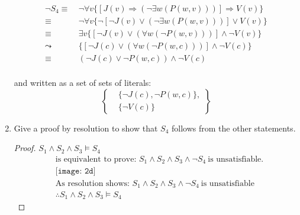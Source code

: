 \documentclass[11pt]{article}
\newcommand{\impl}{\mathbin{\Rightarrow}}
\begin{document}
\begin{enumerate}[label=\alph*.]
    \begin{align*}
        \neg S_4 \equiv\  & \neg \forall v \{ [J(v) \impl (\neg \exists w (P(w, v)))] \impl V(v) \} \\
        \equiv\  & \neg \forall v \{ \neg [\neg J(v) \lor (\neg \exists w (P(w, v)))] \lor V(v) \} \tag{by replacing occurrence of $\Rightarrow$} \\
        \equiv\  & \exists v \{ [\neg J(v) \lor ( \forall w (\neg P(w, v)))] \land \neg V(v) \} \tag{by deriving negation in} \\
        \leadsto\  & \{ [\neg J(c) \lor (\forall w (\neg P(w, c)))] \land \neg V(c) \} \tag{by skolemization} \\
        \equiv\  & (\neg J(c) \lor \neg P(w, c)) \land \neg V(c) \tag{by dropping universal quantifiers} \\
    \end{align*}
    
    and written as a set of sets of literals: 
    $$\left\{
        \begin{aligned}  
            &\{\neg J(c), \neg P(w, c) \}, \\
            &\{\neg V(c) \}
        \end{aligned}
    \right\} $$
    
    \item Give a proof by resolution to show that $S_4$ follows from the other statements.
    
    \begin{proof}
        $S_1 \land S_2 \land S_3 \models S_4$
        \begin{align*}
            & \text{is equivalent to prove: } S_1 \land S_2 \land S_3 \land \neg S_4\ \text{is unsatisfiable.} \\
            & \texttt{[image: 2d]} \\
            & \text{As resolution shows: } S_1 \land S_2 \land S_3 \land \neg S_4\ \text{is unsatisfiable} \\
            & \therefore S_1 \land S_2 \land S_3 \models S_4 \tag*{\qedhere}
        \end{align*}
    \end{proof}
    
\end{enumerate}
\end{document}
